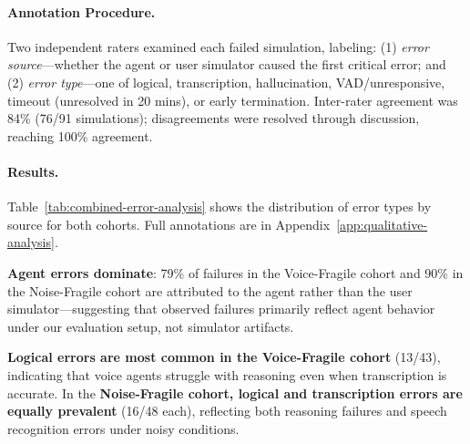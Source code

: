 \paragraph{Annotation Procedure.} Two independent raters examined each failed simulation, labeling: (1) \textit{error source}---whether the agent or user simulator caused the first critical error; and (2) \textit{error type}---one of logical, transcription, hallucination, VAD/unresponsive, timeout (unresolved in 20 mins), or early termination. Inter-rater agreement was 84\% (76/91 simulations); disagreements were resolved through discussion, reaching 100\% agreement. 

\paragraph{Results.} Table~\ref{tab:combined-error-analysis} shows the distribution of error types by source for both cohorts. Full annotations are in Appendix~\ref{app:qualitative-analysis}.

\begin{table}[h]
\caption{Error analysis: distribution of error types by source. Agent errors dominate in both cohorts (79\% and 90\%).}
\label{tab:combined-error-analysis}
\centering
\begin{small}
\resizebox{0.85\columnwidth}{!}{%

}
\end{small}
\end{table}

\textbf{Agent errors dominate}: 79\% of failures in the Voice-Fragile cohort and 90\% in the Noise-Fragile cohort are attributed to the agent rather than the user simulator---suggesting that observed failures primarily reflect agent behavior under our evaluation setup, not simulator artifacts.

\textbf{Logical errors are most common in the Voice-Fragile cohort} (13/43), indicating that voice agents struggle with reasoning even when transcription is accurate. In the \textbf{Noise-Fragile cohort, logical and transcription errors are equally prevalent} (16/48 each), reflecting both reasoning failures and speech recognition errors under noisy conditions.

